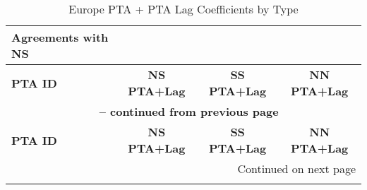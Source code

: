 \begin{longtable}{lccc}
    \caption{Europe PTA + PTA Lag Coefficients by Type} \label{tab:europe_pta} \\

    \hline
    \textbf{Agreements with NS} &  &  &  \\
    \hline
    \textbf{PTA ID} & \textbf{NS PTA+Lag} & \textbf{SS PTA+Lag} & \textbf{NN PTA+Lag} \\
    \hline
    \endfirsthead
    
    \multicolumn{4}{c}{{\bfseries \tablename\ \thetable{} -- continued from previous page}} \\
    \hline
    \textbf{PTA ID} & \textbf{NS PTA+Lag} & \textbf{SS PTA+Lag} & \textbf{NN PTA+Lag} \\
    \hline
    \endhead
    
    \hline \multicolumn{4}{r}{{Continued on next page}} \\ \hline
    \endfoot
    
    \hline
    \endlastfoot
    

\end{longtable}
